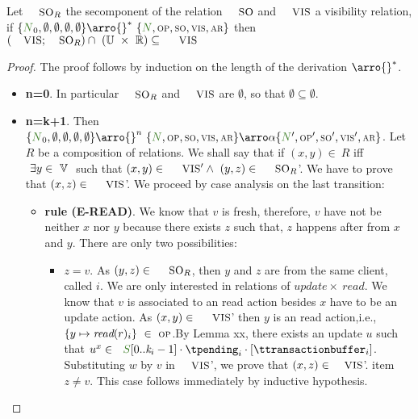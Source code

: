 \documentclass[envcountsect,runningheads,orivec]{llncs}
\begin{document}
\begin{theorem}
\label{theorem:monotonic-read}
Let $\textsc{\small{SO}}_R$ the se\cond component of the relation $\textsc{\small{SO}}$ and $\textsc{\small{VIS}}$ a visibility relation, if $\environment{\systemterm_0}{\emptyset}{\emptyset}{\emptyset}{\emptyset} \arro{} ^*\ \environment{\systemterm}{\op}{\so}{\vis}{\arb}$ then $(\textsc{\small{VIS}};\textsc{\small{SO}}_R) \cap \ (\mathbb{U}\ \times \ \mathbb{R})  \subseteq \ \textsc{\small{VIS}}$

\end{theorem}


\begin{proof} The proof follows by induction on the length of the derivation $\arro{} ^*$.
\begin{itemize}
   \item{\bf n=0}. In particular $\textsc{\small{SO}}_R$ and $\textsc{\small{VIS}}$ are $\emptyset$, so that $\emptyset \subseteq \emptyset$.
   \item{\bf n=k+1}. Then $\environment{\systemterm_0}{\emptyset}{\emptyset}{\emptyset}{\emptyset} \arro{} ^n\ \environment{\systemterm}{\op}{\so}{\vis}{\arb} \arroi{\alpha} \environment{\systemterm'}{\op'}{\so'}{\vis'}{\arb}$. Let $R$ be a composition of relations. We shall say that if $(x,y) \in \ R $ iff $\ \exists y \in\ \mathbb{V}\ $ such that $(x,y) \in\ \textsc{\small{VIS}}' \land \ (y,z) \in\  \textsc{\small{SO}}_R$'. We have to prove that $(x,z) \in \ \textsc{\small{VIS}}$'. We proceed by 
case analysis on the last transition:
	
	\begin{itemize}
        \item {\bf rule (\textsc{E-READ})}. We know that $v$ is fresh, therefore, $v$ have not be neither $x$ nor $y$ because there exists $z$ such that, $z$ happens after from $x$ and $y$. There are only two possibilities:
					
					\begin{itemize}
						\item $z = v$. As $(y,z) \in \ \textsc{\small{SO}}_R$, then $y$ and $z$ are from the same client, called $i$. We are only interested in relations of $update \times\ read$. We know that $v$ is associated to an read action besides $x$ have to be an update action. As $(x,y) \in \ \textsc{\small{VIS}}$' then $y$ is an read action,i.e., $\{y \mapsto \textit{read}(r)_i \}\ \in \ \textsc{\scriptsize{OP}}$.By Lemma xx, there exists an update $u$ such that $u^x \in\ \ \queuemessage[0..\tknown_i-1] \cdot \tpending_i \cdot [\ttransactionbuffer_i]$. Substituting $w$ by $v$ in $\textsc{\small{VIS}}$', we prove that $(x,z) \in \textsc{\small{VIS}}$'.
						item $z \neq v$. This case follows immediately by inductive hypothesis.
					\end{itemize}
					

\end{itemize}
\end{itemize}
\end{proof}
\end{document}
